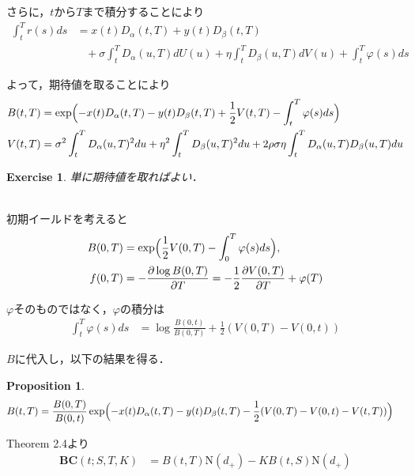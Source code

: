 \documentclass[11pt,a4paper]{jsarticle}
\newcommand{\BC}{\textbf{BC}}
\newtheorem{proposition}[assumption]{Proposition}
\newtheorem{exercise}{Exercise}[section]
\begin{document}
さらに，$t$から$T$まで積分することにより
\begin{align}
\int_t^T r(s) ds
& =
x(t) D_\alpha (t, T) + y(t) D_\beta (t, T) \nonumber \\
& \hspace{10pt}
+ \sigma \int_t^T D_\alpha (u, T) d U(u) + \eta \int_t^T D_\beta (u, T) d V(u)
+ \int_t^T \varphi(s) ds \nonumber
\end{align}

よって，期待値を取ることにより
\begin{align}
B(t, T)
& =
\exp
\Bigl(
-x(t) D_\alpha (t, T) - y(t) D_\beta (t, T) + \frac{1}{2} V(t, T) - \int_t^T \varphi(s) ds
\Bigr) \nonumber \\
V(t, T)
& =
\sigma^2 \int_t^T D_\alpha (u, T)^2 du + \eta^2 \int_t^T D_\beta (u, T)^2 du
+ 2 \rho \sigma \eta \int_t^T D_\alpha (u, T) D_\beta (u, T) du \nonumber
\end{align}

\hrulefill
\begin{exercise}
単に期待値を取ればよい．
\end{exercise}
\hrulefill \\

初期イールドを考えると
\begin{align}
B(0, T)
& =
\exp \Bigl( \frac{1}{2} V(0, T) - \int_0^T \varphi(s) ds \Bigr), \nonumber \\
f (0, T)
& =
- \frac{\partial \log B(0, T)}{\partial T}
= -\frac{1}{2} \frac{\partial V(0, T)}{\partial T} + \varphi(T) \nonumber
\end{align}

$\varphi$そのものではなく，$\varphi$の積分は
\begin{align}
\int_t^T \varphi(s) ds
& =
\log \frac{B(0, t)}{B(0, T)} + \frac{1}{2} (V(0, T) - V(0, t)) \nonumber
\end{align}

$B$に代入し，以下の結果を得る．

\begin{proposition}
\begin{align}
B(t, T)
& =
\frac{B(0, T)}{B(0, t)}
\exp
\Bigl(
-x(t) D_\alpha (t, T) - y(t) D_\beta (t, T) - \frac{1}{2} (V(0, T) - V(0, t) - V(t, T))
\Bigr) \nonumber
\end{align}
\end{proposition}

Theorem 2.4より
\begin{align}
\BC (t; S, T, K)
& =
B(t, T) \mathrm{N}(d_+) - K B(t, S) \mathrm{N}(d_+) \nonumber
\end{align}
\end{document}
